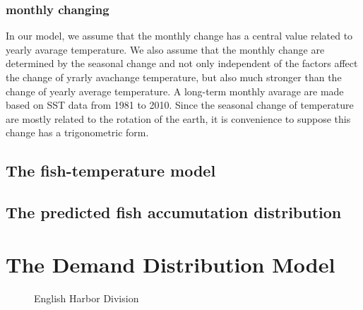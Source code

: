\documentclass{mcmthesis}
\begin{document}
  \subsubsection{monthly changing}
    In our model, we assume that the monthly change has a central value related to yearly avarage temperature. We also assume that the monthly change are determined by the seasonal change and not only independent of the factors affect the change of yrarly avachange temperature, but also much stronger than the change of yearly average temperature. 
    A long-term monthly avarage are made based on SST data from 1981 to 2010. Since the seasonal change of temperature are mostly related to the rotation of the earth, it is convenience to suppose this change has a trigonometric form. 

 \subsection{The fish-temperature model}
 \subsection{The predicted fish accumutation distribution}
 





\section{The Demand Distribution Model}
\begin{figure}[tbp]
  \caption{English Harbor Division}\label{figure1}
\end{figure}
\end{document}
